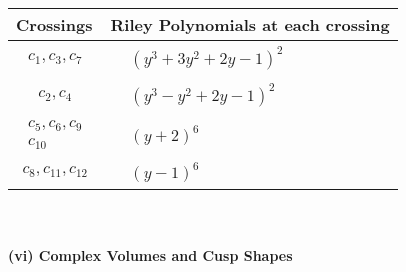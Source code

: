 \documentclass[1p]{elsarticle_modified}
\theoremstyle{definition}
\begin{document}
\begin{tabular}{m{50pt}|m{274pt}}
Crossings & \hspace{64pt}Riley Polynomials at each crossing \\
\hline $$\begin{aligned}c_{1},c_{3},c_{7}\end{aligned}$$&$\begin{aligned}
&(y^3+3 y^2+2 y-1)^2
\end{aligned}$\\
\hline $$\begin{aligned}c_{2},c_{4}\end{aligned}$$&$\begin{aligned}
&(y^3- y^2+2 y-1)^2
\end{aligned}$\\
\hline $$\begin{aligned}c_{5},c_{6},c_{9}\\c_{10}\end{aligned}$$&$\begin{aligned}
&(y+2)^6
\end{aligned}$\\
\hline $$\begin{aligned}c_{8},c_{11},c_{12}\end{aligned}$$&$\begin{aligned}
&(y-1)^6
\end{aligned}$\\
\hline
\end{tabular}\\~\\
\newpage\flushleft \textbf{(vi) Complex Volumes and Cusp Shapes}
\end{document}
